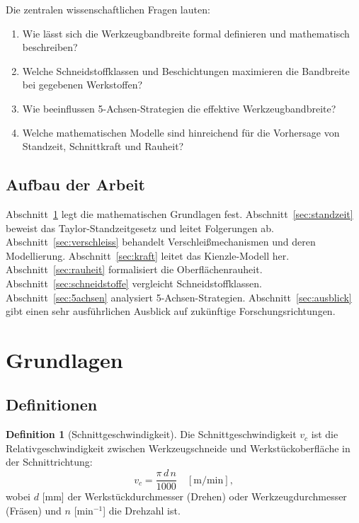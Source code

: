 ﻿\documentclass[a4paper,12pt]{article}
\theoremstyle{definition}
\newtheorem{definition}{Definition}
\begin{document}
Die zentralen wissenschaftlichen Fragen lauten:
\begin{enumerate}
  \item Wie lässt sich die Werkzeugbandbreite formal definieren und mathematisch
        beschreiben?
  \item Welche Schneidstoffklassen und Beschichtungen maximieren die Bandbreite
        bei gegebenen Werkstoffen?
  \item Wie beeinflussen 5-Achsen-Strategien die effektive Werkzeugbandbreite?
  \item Welche mathematischen Modelle sind hinreichend für die Vorhersage von
        Standzeit, Schnittkraft und Rauheit?
\end{enumerate}

\subsection{Aufbau der Arbeit}

Abschnitt~\ref{sec:grundlagen} legt die mathematischen Grundlagen fest.
Abschnitt~\ref{sec:standzeit} beweist das Taylor-Standzeitgesetz und leitet
Folgerungen ab. Abschnitt~\ref{sec:verschleiss} behandelt Verschleißmechanismen
und deren Modellierung. Abschnitt~\ref{sec:kraft} leitet das Kienzle-Modell her.
Abschnitt~\ref{sec:rauheit} formalisiert die Oberflächenrauheit. Abschnitt~\ref{sec:schneidstoffe}
vergleicht Schneidstoffklassen. Abschnitt~\ref{sec:5achsen} analysiert
5-Achsen-Strategien. Abschnitt~\ref{sec:ausblick} gibt einen sehr ausführlichen
Ausblick auf zukünftige Forschungsrichtungen.

\section{Grundlagen}
\label{sec:grundlagen}

\subsection{Definitionen}

\begin{definition}[Schnittgeschwindigkeit]
  Die Schnittgeschwindigkeit $v_c$ ist die Relativgeschwindigkeit zwischen
  Werkzeugschneide und Werkstückoberfläche in der Schnittrichtung:
  \[
    v_c = \frac{\pi \, d \, n}{1000} \quad [\mathrm{m/min}],
  \]
  wobei $d$ [mm] der Werkstückdurchmesser (Drehen) oder Werkzeugdurchmesser
  (Fräsen) und $n$ [min$^{-1}$] die Drehzahl ist.
\end{definition}
\end{document}

